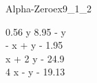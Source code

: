 
\begin{bilevelmodel}{Alpha-Zero}{ex9_1_2}
    \begin{upperlevel}{0}{
        
    }
    \end{upperlevel}
    \begin{lowerlevel}{0.56 y}{
         8.95 - y  \\ 
 - x + y - 1.95  \\ 
 x + 2 y - 24.9  \\ 
 4 x - y - 19.13 
    }
    \end{lowerlevel}
\end{bilevelmodel}
    
        